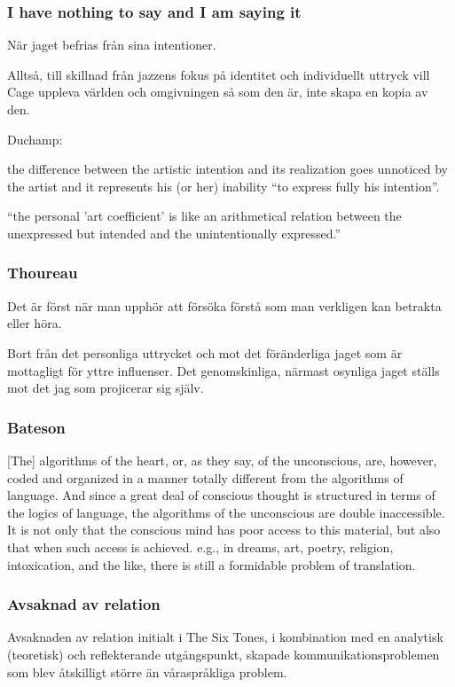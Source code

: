 \documentclass[ignorenonframetext]{beamer}
\begin{document}
  \begin{frame}
    \frametitle{I have nothing to say and I am saying it}
    
    När jaget befrias från sina intentioner.
    \vspace{0.5cm}

    Alltså, till skillnad från jazzens fokus på identitet och individuellt uttryck vill Cage uppleva världen och omgivningen så som den är, inte skapa en kopia av den.
    \vspace{0.5cm}

    Duchamp:

    the difference between the artistic intention and its realization goes unnoticed by the artist and it represents his (or her) inability ``to express fully his intention''. 

    ``the personal ’art coefficient’ is like an arithmetical relation between the unexpressed but intended and the unintentionally expressed.''
  \end{frame}

  \begin{frame}
    \frametitle{Thoureau}
    Det är först när man upphör att försöka förstå som man verkligen kan betrakta eller höra.
    \vspace{0.5cm}

    Bort från det personliga uttrycket och mot det föränderliga jaget som är mottagligt för yttre influenser. Det genomskinliga, närmast osynliga jaget ställs mot det jag som projicerar sig själv.

  \end{frame}

  \begin{frame}
    \frametitle{Bateson}

    [The] algorithms of the heart, or, as they say, of the unconscious, are, however, coded and organized in a manner totally different from the algorithms of language. And since a great deal of conscious thought is structured in terms of the logics of language, the algorithms of the unconscious are double inaccessible. It is not only that the conscious mind has poor access to this material, but also that when such access is achieved. e.g., in dreams, art, poetry, religion, intoxication, and the like, there is still a formidable problem of translation.

  \end{frame}

  \begin{frame}
    \frametitle{Avsaknad av relation}

    Avsaknaden av relation initialt i The Six Tones, i kombination med en analytisk (teoretisk) och reflekterande utgångspunkt, skapade kommunikationsproblemen som blev åtskilligt större än våraspråkliga problem.

  \end{frame}
\end{document}
